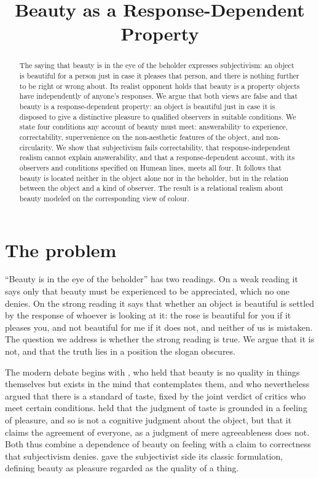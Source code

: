 \documentclass{situationist-preprint}
\title{Beauty as a Response-Dependent Property}
\begin{document}
\maketitle

\begin{abstract}
The saying that beauty is in the eye of the beholder expresses subjectivism: an object is beautiful for a person just in case it pleases that person, and there is nothing further to be right or wrong about. Its realist opponent holds that beauty is a property objects have independently of anyone's responses. We argue that both views are false and that beauty is a response-dependent property: an object is beautiful just in case it is disposed to give a distinctive pleasure to qualified observers in suitable conditions. We state four conditions any account of beauty must meet: answerability to experience, correctability, supervenience on the non-aesthetic features of the object, and non-circularity. We show that subjectivism fails correctability, that response-independent realism cannot explain answerability, and that a response-dependent account, with its observers and conditions specified on Humean lines, meets all four. It follows that beauty is located neither in the object alone nor in the beholder, but in the relation between the object and a kind of observer. The result is a relational realism about beauty modeled on the corresponding view of colour.
\end{abstract}

\section{The problem}

\enquote{Beauty is in the eye of the beholder} has two readings. On a weak reading it says only that beauty must be experienced to be appreciated, which no one denies. On the strong reading it says that whether an object is beautiful is settled by the response of whoever is looking at it: the rose is beautiful for you if it pleases you, and not beautiful for me if it does not, and neither of us is mistaken. The question we address is whether the strong reading is true. We argue that it is not, and that the truth lies in a position the slogan obscures.

The modern debate begins with \citet{Hume1757}, who held that beauty is no quality in things themselves but exists in the mind that contemplates them, and who nevertheless argued that there is a standard of taste, fixed by the joint verdict of critics who meet certain conditions. \citet{Kant1790} held that the judgment of taste is grounded in a feeling of pleasure, and so is not a cognitive judgment about the object, but that it claims the agreement of everyone, as a judgment of mere agreeableness does not. Both thus combine a dependence of beauty on feeling with a claim to correctness that subjectivism denies. \citet{Santayana1896} gave the subjectivist side its classic formulation, defining beauty as pleasure regarded as the quality of a thing.
\end{document}
